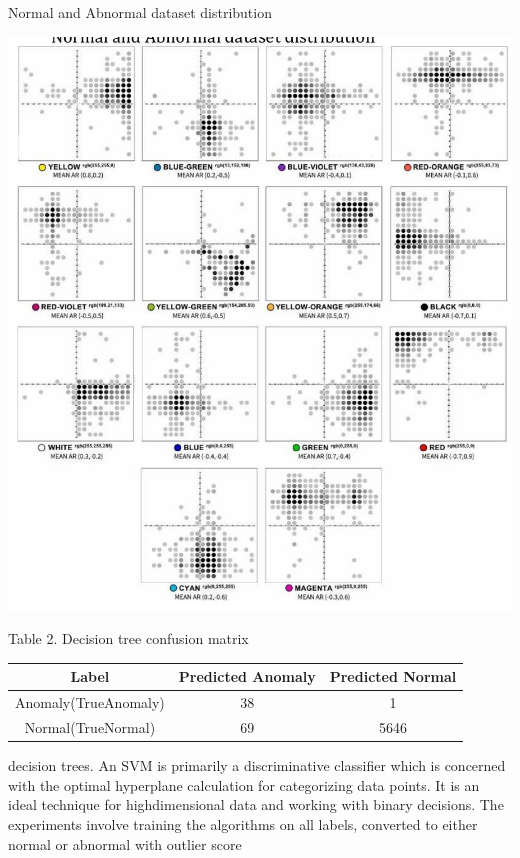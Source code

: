 \documentclass[10pt]{article}
\begin{document}
Normal and Abnormal dataset distribution

\begin{center}
\includegraphics[max width=\textwidth]{2023_01_16_edd5388a973e00ef26e3g-2(6)}
\end{center}

Table 2. Decision tree confusion matrix

\begin{center}
\begin{tabular}{ccc}
\hline
Label & Predicted Anomaly & Predicted Normal \\
\hline
Anomaly(TrueAnomaly) & 38 & 1 \\
Normal(TrueNormal) & 69 & 5646 \\
\end{tabular}
\end{center}

decision trees. An SVM is primarily a discriminative classifier which is concerned with the optimal hyperplane calculation for categorizing data points. It is an ideal technique for highdimensional data and working with binary decisions. The experiments involve training the algorithms on all labels, converted to either normal or abnormal with outlier score
\end{document}
